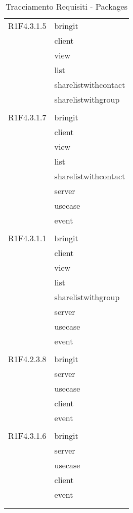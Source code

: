 \begin{center}
\begin{longtable}{|p{7cm}|p{7cm}|}
		R1F4.3.1.5 & bringit \\ & client \\ & view \\ & list \\ & sharelistwithcontact \\ & sharelistwithgroup \\ & \\ \hline
		R1F4.3.1.7 & bringit \\ & client \\ & view \\ & list \\ & sharelistwithcontact \\ & server \\ & usecase \\ & event \\ & \\ \hline
		R1F4.3.1.1 & bringit \\ & client \\ & view \\ & list \\ & sharelistwithgroup \\ & server \\ & usecase \\ & event \\ & \\ \hline
		R1F4.2.3.8 & bringit \\ & server \\ & usecase \\ & client \\ & event \\ & \\ \hline
		R1F4.3.1.6 & bringit \\ & server \\ & usecase \\ & client \\ & event \\ & \\ \hline
	\caption[Tracciamento Requisiti - Packages]{Tracciamento Requisiti - Packages}
	\label{tabella: Tracciamento Requisiti - Packages}
	\end{longtable}
\end{center}
